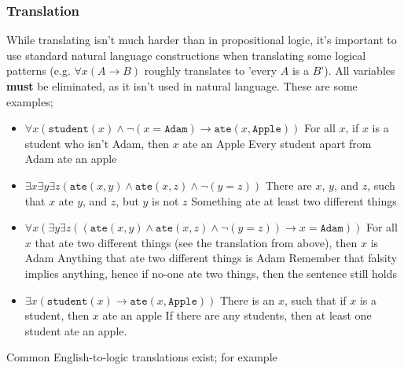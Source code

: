 \documentclass[a4paper, 12pt]{article}
\begin{document}
            \subsubsection*{Translation}
                While translating isn't much harder than in propositional logic, it's important to use standard natural language constructions when translating some logical patterns (e.g. $\forall x (A \rightarrow B)$ roughly translates to 'every $A$ is a $B$'). All variables \textbf{must} be eliminated, as it isn't used in natural language. These are some examples;
                \begin{itemize}
                    \itemsep0em
                    \item $\forall x (\texttt{student}(x) \land \neg (x = \texttt{Adam}) \rightarrow \texttt{ate}(x, \texttt{Apple}))$
                        \subitem For all $x$, if $x$ is a student who isn't Adam, then $x$ ate an Apple
                        \subitem Every student apart from Adam ate an apple
                    \item $\exists x \exists y \exists z (\texttt{ate}(x, y) \land \texttt{ate}(x, z) \land \neg (y = z))$
                        \subitem There are $x$, $y$, and $z$, such that $x$ ate $y$, and $z$, but $y$ is not $z$
                        \subitem Something ate at least two different things
                    \item $\forall x (\exists y \exists z ((\texttt{ate}(x, y) \land \texttt{ate}(x, z) \land \neg (y = z)) \rightarrow x = \texttt{Adam}))$
                        \subitem For all $x$ that ate two different things (see the translation from above), then $x$ is Adam
                        \subitem Anything that ate two different things is Adam
                        \subitem Remember that falsity implies anything, hence if no-one ate two things, then the sentence still holds
                    \item $\exists x (\texttt{student}(x) \rightarrow \texttt{ate}(x, \texttt{Apple}))$
                        \subitem There is an $x$, such that if $x$ is a student, then $x$ ate an apple
                        \subitem If there are any students, then at least one student ate an apple.
                \end{itemize}
                Common English-to-logic translations exist; for example
\end{document}
